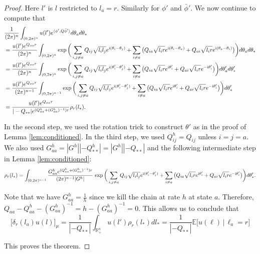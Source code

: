\documentclass[a4paper, 11pt]{article}
\newcommand{\E}{\mathbb{E}}
\newcommand{\compi}{\textnormal{i}}
\begin{document}
\begin{proof}
Here $l'$ is $l$ restricted to $l_a=r$. Similarly for $\phi'$ and $\bar{\phi}'$. We now continue to compute that
\begin{equation*}
\begin{aligned}
& \frac{1}{(2\pi)^n}\int_{(0,2\pi)^n} u(l') e^{\langle \phi',Q\bar{\phi}'\rangle}d\theta_a d\theta_*\\
&=\frac{u(l')e^{Q_{aa}r}}{(2\pi)^n}\int_{(0,2\pi)^n}\exp\bigg(\sum_{i,j\neq a} Q_{ij}\sqrt{l_i l_j}e^{\compi (\theta_i-\theta_j)}
+\sum_{i\neq a}\big(Q_{ia}\sqrt{l_i r}e^{\compi(\theta_i-\theta_a)}+Q_{ai}\sqrt{l_i r}e^{\compi(\theta_a-\theta_i)}\big) \bigg)d\theta_a d\theta_*\\
&=\frac{u(l')e^{Q_{aa}r}}{(2\pi)^n}\int_{(0,2\pi)^n}\exp\bigg(\sum_{i,j\neq a} Q_{ij}\sqrt{l_i l_j}e^{\compi (\theta_i'-\theta_j')}
+\sum_{i\neq a}\big(Q_{ia}\sqrt{l_i r}e^{\compi \theta_i'}+Q_{ai}\sqrt{l_i r}e^{-\compi \theta_i'}\big) \bigg)d\theta_a' d\theta_*'\\
&=\frac{u(l')e^{Q_{aa}r}}{(2\pi)^{n-1}}\int_{(0,2\pi)^{n-1}}\exp\bigg(\sum_{i,j\neq a} Q_{ij}\sqrt{l_i l_j}e^{\compi (\theta_i'-\theta_j')}
+\sum_{i\neq a}\big(Q_{ia}\sqrt{l_i r}e^{\compi \theta_i'}+Q_{ai}\sqrt{l_i r}e^{-\compi \theta_i'}\big) \bigg) d\theta_*'\\
&=\frac{u(l')e^{Q_{aa}r}}{|-Q_{**}|e^{(Q_{aa}^h+(G_{aa}^h)^{-1})r}}\rho_r(l_*).
\end{aligned}
\end{equation*}

In the second step, we used the rotation trick to construct $\theta'$ as in the proof of Lemma \ref{lem:conditioned}. In the third step, we used $Q_{ij}^h=Q_{ij}$ unless $i=j=a$. We also used $G_{aa}^h=|G^h||-Q_{**}^h|=|G^h||-Q_{**}|$ and the following intermediate step in Lemma \ref{lem:conditioned}:
\[\rho_r(l_*)
=\int_{(0,2\pi)^{n-1}}\frac{G_{aa}^h e^{(Q_{aa}^h+(G_{aa}^h)^{-1})r}}{(2\pi)^{n-1}|G^h|}\, \exp\bigg(\sum_{i,j\neq a} Q_{ij}\sqrt{l_i l_j}e^{\compi (\theta_i'-\theta_j')} +\sum_{i\neq a}\big(Q_{ia}\sqrt{l_i r}e^{\compi \theta_i'}+Q_{ai}\sqrt{l_i r}e^{-\compi \theta_i'}\big) \bigg)d\theta_*'.\]

Note that we have $G_{aa}^h=\frac{1}{h}$ since we kill the chain at rate $h$ at state $a$. Therefore, $Q_{aa}-Q_{aa}^h-(G_{aa}^h)^{-1}=h-(G_{aa}^h)^{-1}=0$. This allows us to conclude that
\[\big[ \delta_r(l_a)  u(l)\big]_\mu=\frac{1}{|-Q_{**}|}\int_{\mathbb{R}_+^n}u(l')\rho_r(l_*)dl_*=\frac{1}{|-Q_{**}|}\E\big[u(\ell)\,|\,\ell_a=r\big]\]

This proves the theorem.
\end{proof}
\end{document}
